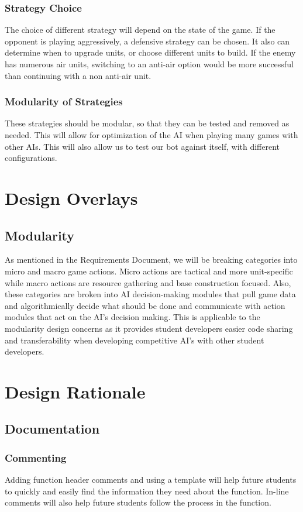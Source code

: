 \documentclass[10pt,letterpaper,onecolumn,draftclsnofoot]{IEEEtran}
\begin{document}
\subsubsection{Strategy Choice}
	The choice of different strategy will depend on the state of the game. If the opponent is playing aggressively, a defensive strategy can be chosen. It also can determine when to upgrade units, or choose different units to build. If the enemy has numerous air units, switching to an anti-air option would be more successful than continuing with a non anti-air unit. 
\subsubsection{Modularity of Strategies}
	These strategies should be modular, so that they can be tested and removed as needed. This will allow for optimization of the AI when playing many games with other AIs. This will also allow us to test our bot against itself, with different configurations.
\section{Design Overlays}
\subsection{Modularity}
	As mentioned in the Requirements Document, we will be breaking categories into micro and macro game actions. Micro actions are tactical and more unit-specific while macro actions are resource gathering and base construction focused. Also, these categories are broken into AI decision-making modules that pull game data and algorithmically decide what should be done and communicate with action modules that act on the AI's decision making. This is applicable to the modularity design concerns as it provides student developers easier code sharing and transferability when developing competitive AI's with other student developers. 
\section{Design Rationale}
\subsection{Documentation}
\subsubsection{Commenting}
	Adding function header comments and using a template will help future students to quickly and easily find the information they need about the function. In-line comments will also help future students follow the process in the function.
\end{document}
